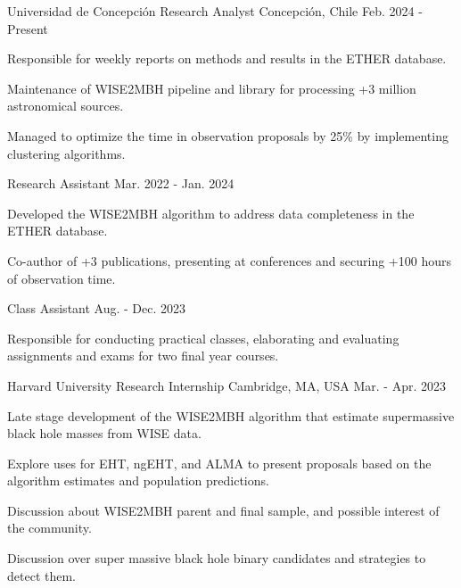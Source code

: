 
\begin{cventries}

\cventry
    {Universidad de Concepción}
    {Research Analyst}
    {Concepción, Chile}
    {Feb. 2024 - Present}
    {
      \begin{cvitems}
        \item{Responsible for weekly reports on methods and results in the ETHER database.}
        \item{Maintenance of WISE2MBH pipeline and library for processing +3 million astronomical sources.}
        \item{Managed to optimize the time in observation proposals by 25\% by implementing clustering algorithms.}
      \end{cvitems}
      \vspace{1em}
    }

  \cventryprevrole
    {Research Assistant}
    {Mar. 2022 - Jan. 2024}
    {
      \begin{cvitems}
        \item{Developed the WISE2MBH algorithm to address data completeness in the ETHER database.}
        \item{Co-author of +3 publications, presenting at conferences and securing +100 hours of observation time.}
      \end{cvitems}
      \vspace{1em}
    }

  \cventryprevrole
    {Class Assistant}
    {Aug. - Dec. 2023}
    {
      \begin{cvitems}
        \item{Responsible for conducting practical classes, elaborating and evaluating assignments and exams for two final year courses.}
      \end{cvitems}
      \vspace{1em}
    }

  \cventry
    {Harvard University}
    {Research Internship}
    {Cambridge, MA, USA}
    {Mar. - Apr. 2023}
    {
      \begin{cvitems}
        \item{Late stage development of the WISE2MBH algorithm that estimate supermassive black hole masses from WISE data.}
        \item{Explore uses for EHT, ngEHT, and ALMA to present proposals based on the algorithm estimates and population predictions.}
        \item {Discussion about WISE2MBH parent and final sample, and possible interest of the community.}
        \item{Discussion over super massive black hole binary candidates and strategies to detect them.}
      \end{cvitems}
      \vspace{1em}
    }


\end{cventries}
